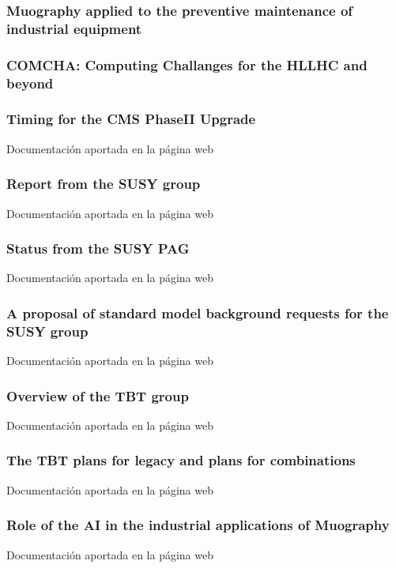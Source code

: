 \documentclass[a4paper, 11pt, twoside, openright]{report}
\begin{document}
\subsubsection{Muography applied to the preventive maintenance of industrial equipment}

\subsubsection{COMCHA: Computing Challanges for the HLLHC and beyond}

\subsubsection{Timing for the CMS PhaseII Upgrade}
%
Documentación aportada en la página web
\subsubsection{Report from the SUSY group}
%
Documentación aportada en la página web
\subsubsection{Status from the SUSY PAG}
%
Documentación aportada en la página web
\subsubsection{A proposal of standard model background requests for the SUSY group}
%
Documentación aportada en la página web
\subsubsection{Overview of the TBT group}
%
Documentación aportada en la página web
\subsubsection{The TBT plans for legacy and plans for combinations}
%
Documentación aportada en la página web
\subsubsection{Role of the AI in the industrial applications of Muography}
%
Documentación aportada en la página web
\end{document}
